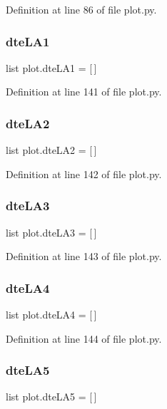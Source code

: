 Definition at line 86 of file plot.\+py.

\mbox{\label{namespaceplot_a51c2146eb53a48f5e4737a91bd15474a}} 
\subsubsection{dte\+L\+A1}
{\footnotesize\ttfamily list plot.\+dte\+L\+A1 = [$\,$]}



Definition at line 141 of file plot.\+py.

\mbox{\label{namespaceplot_abe20e627c51c1c6e17cefa55e0c76d46}} 
\subsubsection{dte\+L\+A2}
{\footnotesize\ttfamily list plot.\+dte\+L\+A2 = [$\,$]}



Definition at line 142 of file plot.\+py.

\mbox{\label{namespaceplot_aa0d528afa0591de6abf4e169f4f56b2a}} 
\subsubsection{dte\+L\+A3}
{\footnotesize\ttfamily list plot.\+dte\+L\+A3 = [$\,$]}



Definition at line 143 of file plot.\+py.

\mbox{\label{namespaceplot_ae64c3e9e57d4e11def74a5481d982873}} 
\subsubsection{dte\+L\+A4}
{\footnotesize\ttfamily list plot.\+dte\+L\+A4 = [$\,$]}



Definition at line 144 of file plot.\+py.

\mbox{\label{namespaceplot_ad3b5d278fbba8b71a5cee5bb4c08e10b}} 
\subsubsection{dte\+L\+A5}
{\footnotesize\ttfamily list plot.\+dte\+L\+A5 = [$\,$]}



